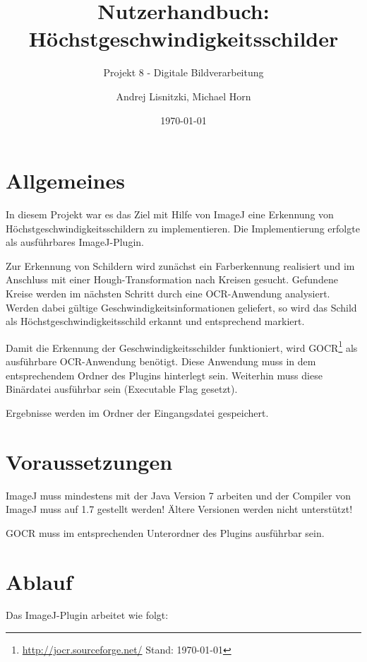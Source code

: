 						

\title{Nutzerhandbuch:  Höchstgeschwindigkeitsschilder}
\subtitle{Projekt 8 - Digitale Bildverarbeitung}

\author{Andrej Lisnitzki, Michael Horn\vspace{4cm}}
\date{\today}

\maketitle

\section{Allgemeines}
In diesem Projekt war es das Ziel mit Hilfe von ImageJ eine Erkennung von Höchstgeschwindigkeitsschildern zu implementieren.
Die Implementierung erfolgte als ausführbares ImageJ-Plugin.

Zur Erkennung von Schildern wird zunächst ein Farberkennung realisiert und im Anschluss mit einer Hough-Transformation nach Kreisen gesucht.
Gefundene Kreise werden im nächsten Schritt durch eine OCR-Anwendung analysiert.
Werden dabei gültige Geschwindigkeitsinformationen geliefert, so wird das Schild als Höchstgeschwindigkeitsschild erkannt und entsprechend markiert.

Damit die Erkennung der Geschwindigkeitsschilder funktioniert, wird GOCR\footnote{\url{http://jocr.sourceforge.net/} Stand: \today} als ausführbare OCR-Anwendung benötigt.
Diese Anwendung muss in dem entsprechendem Ordner des Plugins hinterlegt sein.
Weiterhin muss diese Binärdatei ausführbar sein (Executable Flag gesetzt).

Ergebnisse werden im Ordner der Eingangsdatei gespeichert.

\pagebreak
\section{Voraussetzungen}
ImageJ muss mindestens mit der Java Version 7 arbeiten und der Compiler von ImageJ muss auf 1.7 gestellt werden!
Ältere Versionen werden nicht unterstützt!

GOCR muss im entsprechenden Unterordner des Plugins ausführbar sein.

\section{Ablauf}
Das ImageJ-Plugin arbeitet wie folgt:

